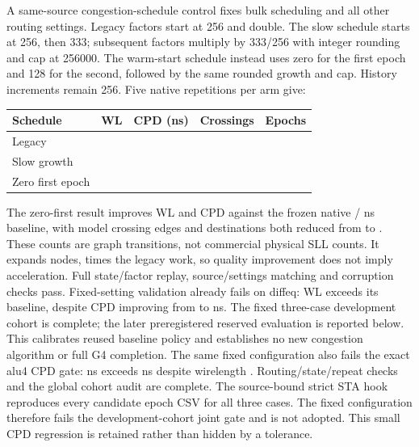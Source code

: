\documentclass[10pt]{article}
\begin{document}
A same-source congestion-schedule control fixes bulk scheduling and all
other routing settings. Legacy factors start at 256 and double. The slow
schedule starts at 256, then 333; subsequent factors multiply by 333/256
with integer rounding and cap at 256000. The warm-start schedule instead
uses zero for the first epoch and 128 for the second, followed by the same
rounded growth and cap. History increments remain 256. Five native
repetitions per arm give:
\begin{center}
\begin{tabular}{lrrrr}\toprule
Schedule & WL & CPD (ns) & Crossings & Epochs \\
\midrule
Legacy & \PresentLegacyWL{} & \PresentLegacyCPD{} & \PresentLegacyCrossings{} & \PresentLegacyEpochs{} \\
Slow growth & \PresentSlowWL{} & \PresentSlowCPD{} & \PresentSlowCrossings{} & \PresentSlowEpochs{} \\
Zero first epoch & \PresentWarmWL{} & \PresentWarmCPD{} & \PresentWarmCrossings{} & \PresentWarmEpochs{} \\
\bottomrule
\end{tabular}
\end{center}
The zero-first result improves WL and CPD against the frozen native
\VPRBaselineWL{}/\VPRBaselineCPD{} ns baseline, with model crossing edges
and destinations both reduced from \PresentBaselineCrossings{} to
\PresentWarmCrossings{}. These counts are graph transitions, not commercial
physical SLL counts. It expands \PresentWarmExpanded{} nodes,
\PresentWarmExpansionRatio{} times the legacy work, so quality improvement
does not imply acceleration. Full state/factor replay, source/settings
matching and corruption checks pass. Fixed-setting validation already fails
on diffeq: WL \FixedDiffeqWL{} exceeds its \FixedDiffeqBaselineWL{} baseline,
despite CPD improving from \FixedDiffeqBaselineCPD{} to \FixedDiffeqCPD{} ns.
The fixed three-case development cohort is complete; the later preregistered
reserved evaluation is reported below.
This calibrates reused baseline policy and establishes no new congestion
algorithm or full G4 completion.
The same fixed configuration also fails the exact alu4 CPD gate:
\FixedAluCPD{} ns exceeds \FixedAluBaselineCPD{} ns despite wirelength
\FixedAluWL{}. Routing/state/repeat checks and the global cohort audit are complete.
The source-bound strict STA hook reproduces every candidate epoch CSV
for all three cases. The fixed configuration therefore fails the
development-cohort joint gate and is not adopted.
This small CPD regression is retained rather than hidden by a tolerance.
\end{document}
